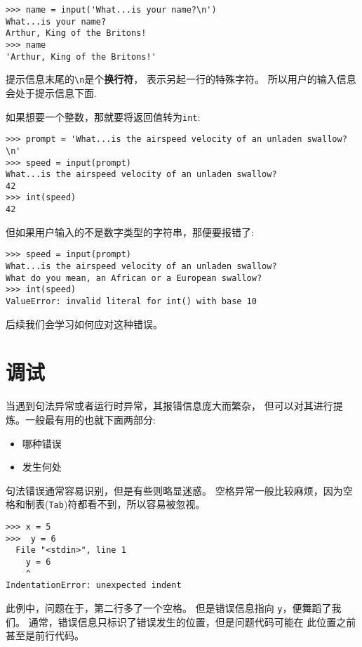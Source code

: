 \documentclass[10pt]{book}
\begin{document}
\begin{verbatim}
>>> name = input('What...is your name?\n')
What...is your name?
Arthur, King of the Britons!
>>> name
'Arthur, King of the Britons!'
\end{verbatim}
%
提示信息末尾的\verb"\n"是个{\bf 换行符}， 表示另起一行的特殊字符。
所以用户的输入信息会处于提示信息下面.  

如果想要一个整数，那就要将返回值转为{\tt int}:

\begin{verbatim}
>>> prompt = 'What...is the airspeed velocity of an unladen swallow?\n'
>>> speed = input(prompt)
What...is the airspeed velocity of an unladen swallow?
42
>>> int(speed)
42
\end{verbatim}
%
但如果用户输入的不是数字类型的字符串，那便要报错了:

\begin{verbatim}
>>> speed = input(prompt)
What...is the airspeed velocity of an unladen swallow?
What do you mean, an African or a European swallow?
>>> int(speed)
ValueError: invalid literal for int() with base 10
\end{verbatim}
%
后续我们会学习如何应对这种错误。


\section{调试}
\label{whitespace}

当遇到句法异常或者运行时异常，其报错信息庞大而繁杂，
但可以对其进行提炼。一般最有用的也就下面两部分:

\begin{itemize}

\item 哪种错误

\item 发生何处

\end{itemize}

句法错误通常容易识别，但是有些则略显迷惑。
空格异常一般比较麻烦，因为空格和制表({\tt Tab})符都看不到，所以容易被忽视。

\begin{verbatim}
>>> x = 5
>>>  y = 6
  File "<stdin>", line 1
    y = 6
    ^
IndentationError: unexpected indent
\end{verbatim}
%
此例中，问题在于，第二行多了一个空格。
但是错误信息指向 {\tt y}，便舞蹈了我们。
通常，错误信息只标识了错误发生的位置，但是问题代码可能在
此位置之前甚至是前行代码。
\end{document}

